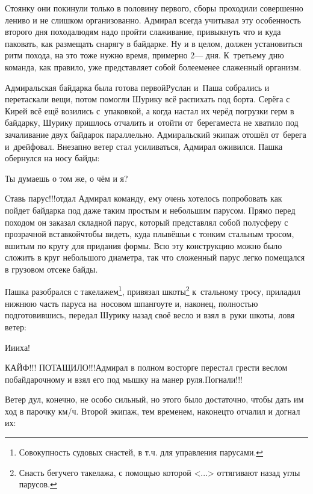 Стоянку они покинули только в половину первого, сборы проходили совершенно лениво и не слишком организованно. Адмирал всегда учитывал эту особенность второго дня похода\mdash людям надо пройти слаживание, привыкнуть что и куда паковать, как размещать снарягу в байдарке. Ну и в целом, должен установиться ритм похода, на это тоже нужно время, примерно 2\thinspace\nobreakdash--- дня. К~третьему дню команда, как правило, уже представляет собой более\sdash менее слаженный организм. 

Адмиральская байдарка была готова первой\mdash Руслан и~Паша собрались и перетаскали вещи, потом помогли Шурику всё распихать под борта. Серёга с Кирей всё ещё возились с~упаковкой, а когда настал их черёд погрузки герм в байдарку, Шурику пришлось отчалить и~отойти от~берега\mdash места не хватило под зачаливание двух байдарок параллельно. Адмиральский экипаж отошёл от~берега и~дрейфовал. Внезапно ветер стал усиливаться, Адмирал оживился. Пашка обернулся на носу байды:

\diagdash Ты думаешь о том же, о чём и я?

\diagdash Ставь парус!!!\mdash отдал Адмирал команду, ему очень хотелось попробовать как пойдет байдарка под даже таким простым и небольшим парусом. Прямо перед походом он заказал складной парус, который представлял собой полусферу с прозрачной вставкой\mdash чтобы видеть, куда плывёшь\mdash и с тонким стальным тросом, вшитым по кругу для придания формы. Всю эту конструкцию можно было сложить в круг небольшого диаметра, так что сложенный парус легко помещался в грузовом отсеке байды.

\renewcommand*{\thefootnote}{\arabic{footnote}}
Пашка разобрался с такелажем\footnote{Совокупность судовых снастей, в т.ч. для управления парусами\cite{МорскойСправочник}.}, привязал шкоты\footnote{Снасть бегучего такелажа, с помощью которой <...> оттягивают назад углы парусов\cite{МорскойСправочник}.} к~стальному тросу, приладил нижнюю часть паруса на~носовом шпангоуте и, наконец, полностью подготовившись, передал Шурику назад своё весло и взял в~руки шкоты, ловя ветер:

\diagdash И\sdash и\sdash иха! 

\diagdash КАЙФ!!! ПОТАЩИЛО!!!\mdash Адмирал в полном восторге перестал грести веслом по\sdash байдарочному и взял его под мышку на манер руля.\mdash Погнали!!!

Ветер дул, конечно, не особо сильный, но этого было достаточно, чтобы дать им ход в парочку км/ч. Второй экипаж, тем временем, наконец\sdash то отчалил и догнал их:

